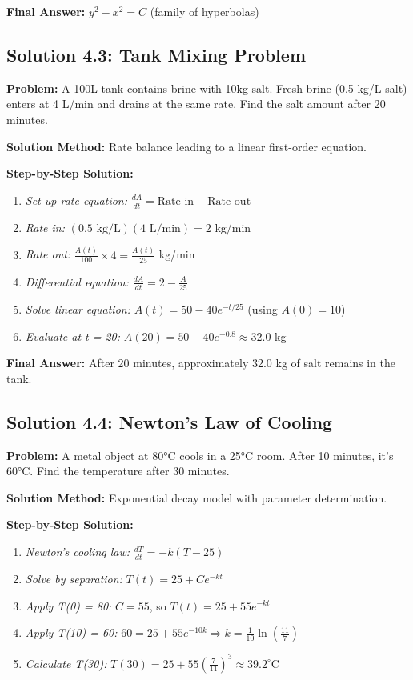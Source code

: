 \documentclass[12pt, letterpaper]{book}
\theoremstyle{problemstyle}
\theoremstyle{solutionstyle}
\begin{document}
\textbf{Final Answer:} $y^2 - x^2 = C$ (family of hyperbolas)

\subsection{Solution 4.3: Tank Mixing Problem}

\textbf{Problem:} A 100L tank contains brine with 10kg salt. Fresh brine (0.5 kg/L salt) enters at 4 L/min and drains at the same rate. Find the salt amount after 20 minutes.

\textbf{Solution Method:} Rate balance leading to a linear first-order equation.

\textbf{Step-by-Step Solution:}
\begin{enumerate}
    \item \textit{Set up rate equation:} $\frac{dA}{dt} = \text{Rate in} - \text{Rate out}$
    \item \textit{Rate in:} $(0.5 \text{ kg/L})(4 \text{ L/min}) = 2$ kg/min
    \item \textit{Rate out:} $\frac{A(t)}{100} \times 4 = \frac{A(t)}{25}$ kg/min
    \item \textit{Differential equation:} $\frac{dA}{dt} = 2 - \frac{A}{25}$
    \item \textit{Solve linear equation:} $A(t) = 50 - 40e^{-t/25}$ (using $A(0) = 10$)
    \item \textit{Evaluate at t = 20:} $A(20) = 50 - 40e^{-0.8} \approx 32.0$ kg
\end{enumerate}

\textbf{Final Answer:} After 20 minutes, approximately 32.0 kg of salt remains in the tank.

\subsection{Solution 4.4: Newton's Law of Cooling}

\textbf{Problem:} A metal object at 80°C cools in a 25°C room. After 10 minutes, it's 60°C. Find the temperature after 30 minutes.

\textbf{Solution Method:} Exponential decay model with parameter determination.

\textbf{Step-by-Step Solution:}
\begin{enumerate}
    \item \textit{Newton's cooling law:} $\frac{dT}{dt} = -k(T - 25)$
    \item \textit{Solve by separation:} $T(t) = 25 + Ce^{-kt}$
    \item \textit{Apply T(0) = 80:} $C = 55$, so $T(t) = 25 + 55e^{-kt}$
    \item \textit{Apply T(10) = 60:} $60 = 25 + 55e^{-10k} \Rightarrow k = \frac{1}{10}\ln\left(\frac{11}{7}\right)$
    \item \textit{Calculate T(30):} $T(30) = 25 + 55\left(\frac{7}{11}\right)^3 \approx 39.2^\circ$C
\end{enumerate}
\end{document}
